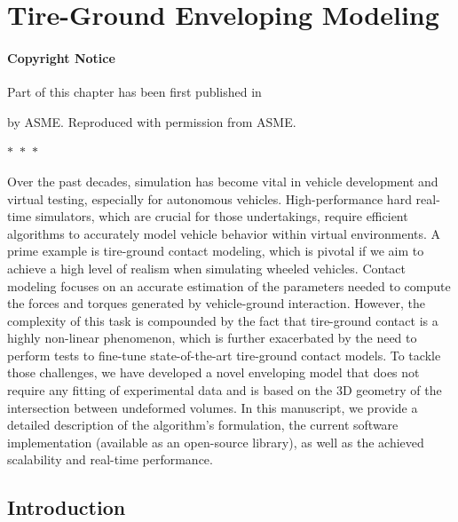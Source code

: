 
\chapter{Tire-Ground Enveloping Modeling}
\label{chap3:enve}

\subsubsection*{Copyright Notice}
Part of this chapter has been first published in
%
\begin{center}
  \begin{minipage}{0.9\textwidth}
  \end{minipage}
\end{center}
%
by ASME. Reproduced with permission from ASME.

\begin{center}
  $\ast$~$\ast$~$\ast$
\end{center}

Over the past decades, simulation has become vital in vehicle development and virtual testing, especially for autonomous vehicles. High-performance hard real-time simulators, which are crucial for those undertakings, require efficient algorithms to accurately model vehicle behavior within virtual environments. A prime example is tire-ground contact modeling, which is pivotal if we aim to achieve a high level of realism when simulating wheeled vehicles. Contact modeling focuses on an accurate estimation of the parameters needed to compute the forces and torques generated by vehicle-ground interaction. However, the complexity of this task is compounded by the fact that tire-ground contact is a highly non-linear phenomenon, which is further exacerbated by the need to perform tests to fine-tune state-of-the-art tire-ground contact models. To tackle those challenges, we have developed a novel enveloping model that does not require any fitting of experimental data and is based on the 3D geometry of the intersection between undeformed volumes. In this manuscript, we provide a detailed description of the algorithm's formulation, the current software implementation (available as an open-source library), as well as the achieved scalability and real-time performance.


\section{Introduction}
\label{chap3:Introduction}

